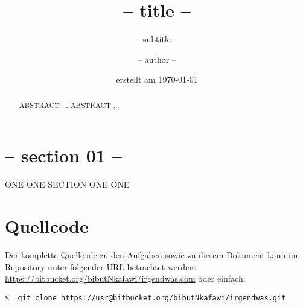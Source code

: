 \documentclass[
   draft=false
  ,paper=a4
  ,twoside=false
  ,fontsize=11pt
  ,headsepline
  ,BCOR10mm
  ,DIV11
  ,parskip=full+
]{scrartcl} %
\begin{document}
\titlehead{-- titel head --}%
\subject{-- subject --}
\title{-- title --}
\subtitle{-- subtitle --}
\author{-- author --}
\date{erstellt am \today}%
\maketitle%
\begin{abstract}
  ABSTRACT ... ABSTRACT ...
\end{abstract}
\tableofcontents
\flushleft
\section{-- section 01 --}
ONE ONE SECTION ONE ONE

\section{Quellcode}
Der komplette Quellcode zu den Aufgaben sowie zu diesem Dokument kann im
Repository unter folgender URL betrachtet werden:\newline
\url{https://bitbucket.org/bibutNkafawi/irgendwas.com} \newline
oder einfach:

\begin{verbatim}
$  git clone https://usr@bitbucket.org/bibutNkafawi/irgendwas.git
\end{verbatim}
\end{document}
